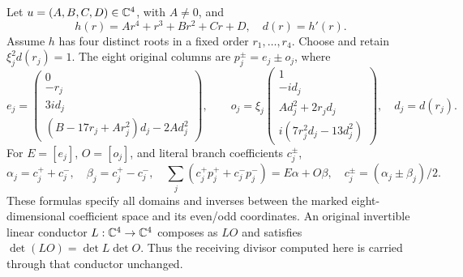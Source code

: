 Let $u=(A,B,C,D)\in\mathbb C^4$, with $A\ne0$, and
\begin{equation}
 h(r)=Ar^4+r^3+Br^2+Cr+D,\quad d(r)=h'(r).
 \tag{OF1}
\end{equation}
Assume $h$ has four distinct roots in a fixed order $r_1,\ldots,r_4$.
Choose and retain $\xi_j^2d(r_j)=1$. The eight original columns are
$p_j^\pm=e_j\pm o_j$, where
\begin{equation}
 e_j=\begin{pmatrix}0\\-r_j\\3i d_j\\
 (B-17r_j+Ar_j^2)d_j-2Ad_j^2\end{pmatrix},\qquad
 o_j=\xi_j\begin{pmatrix}1\\-id_j\\Ad_j^2+2r_jd_j\\
 i(7r_j^2d_j-13d_j^2)\end{pmatrix},\quad d_j=d(r_j).
 \tag{OF2}
\end{equation}
For $E=[e_j]$, $O=[o_j]$, and literal branch coefficients $c_j^\pm$,
\begin{equation}
 \alpha_j=c_j^++c_j^-,\quad\beta_j=c_j^+-c_j^-,\quad
 \sum_j(c_j^+p_j^++c_j^-p_j^-)=E\alpha+O\beta,\quad
 c_j^\pm=(\alpha_j\pm\beta_j)/2.\tag{OF3}
\end{equation}
These formulas specify all domains and inverses between the marked
eight-dimensional coefficient space and its even/odd coordinates.
An original invertible linear conductor $L:\mathbb C^4\to\mathbb C^4$ composes
as $LO$ and satisfies $\det(LO)=\det L\det O$. Thus the receiving
divisor computed here is carried through that conductor unchanged.

